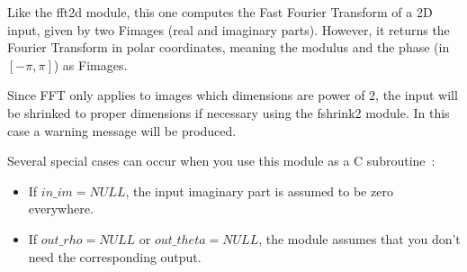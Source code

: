 Like the {\sf fft2d} module, this one computes the Fast Fourier Transform 
of a 2D input, given by two Fimages (real and imaginary parts). However,
it returns the Fourier Transform in polar coordinates, meaning the modulus
and the phase (in $[-\pi,\pi]$) as Fimages. 

\vskip 0.3cm

Since FFT only applies
to images which dimensions are power of $2$, the input will be shrinked 
to proper dimensions if necessary using the {\sf fshrink2} module. In this
case a warning message will be produced.

\vskip 0.3cm

Several special cases can occur when you use this module as a 
C subroutine~:
\begin{itemize}
\item If $in\_im=NULL$, the input imaginary part is assumed to be zero 
everywhere.
\item If $out\_rho=NULL$ or $out\_theta=NULL$, the module assumes that you
don't need the corresponding output.
\end{itemize}

